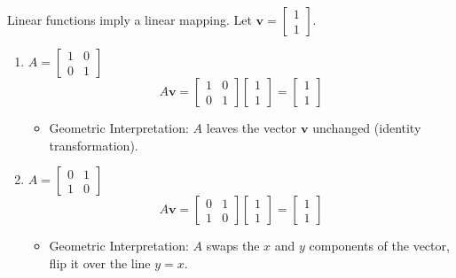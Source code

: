     \begin{intuition}
        Linear functions imply a linear mapping. Let $\mathbf{v} = \begin{bmatrix} 1 \\ 1 \end{bmatrix}$.

        \begin{enumerate}
            \item $A = \begin{bmatrix} 1 & 0 \\ 0 & 1 \end{bmatrix}$
            \[
            A \mathbf{v} = \begin{bmatrix} 1 & 0 \\ 0 & 1 \end{bmatrix} \begin{bmatrix} 1 \\ 1 \end{bmatrix} = \begin{bmatrix} 1 \\ 1 \end{bmatrix}
            \]
            \begin{itemize}
                \item Geometric Interpretation: $A$ leaves the vector $\mathbf{v}$ unchanged (identity transformation).
            \end{itemize}
        
            \item $A = \begin{bmatrix} 0 & 1 \\ 1 & 0 \end{bmatrix}$
            \[
            A \mathbf{v} = \begin{bmatrix} 0 & 1 \\ 1 & 0 \end{bmatrix} \begin{bmatrix} 1 \\ 1 \end{bmatrix} = \begin{bmatrix} 1 \\ 1 \end{bmatrix}
            \]
            \begin{itemize}
                \item Geometric Interpretation: $A$ swaps the $x$ and $y$ components of the vector, flip it over the line $y=x$.
            \end{itemize}
        

\end{enumerate}
\end{intuition}
